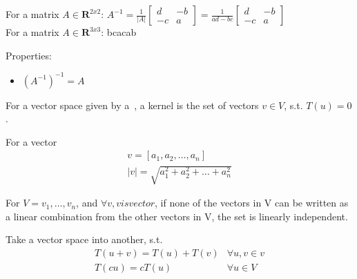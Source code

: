 \begin{definition}[Inverse]
    For a matrix $A \in \mathbf{R}^{2x2}$:
    $A^{-1} = \frac{1}{|A|}
        \begin{bmatrix}
            d & -b \\
            -c & a
        \end{bmatrix}
    = \frac{1}{ad - bc}
        \begin{bmatrix}
            d & -b \\
            -c & a
        \end{bmatrix}
    $\\
    For a matrix $A \in \mathbf{R}^{3x3}$: bcacab

    Properties:
    \begin{itemize}
        \item $(A^{-1})^{-1} = A$
    \end{itemize}
\end{definition}

\begin{definition}[Kernel]
    For a vector space given by a~, a kernel is the set
    of vectors $v \in V$, s.t. $T(u) = 0$.
\end{definition}

\begin{definition}\label{vectorlength}
    For a vector 
    \begin{align*}
        v = [a_{1}, a_{2}, \dots , a_{n}] \\
        |v| = \sqrt{a^{2}_{1} + a^{2}_{2} + \dots + a^{2}_{n}}{}
    \end{align*}
\end{definition}

\begin{definition}
    For $V = {v_{1}, \dots, v_{n}}$, and $\forall v, v is vector$,
    if none of the vectors in V can be written as a linear combination
    from the other vectors in V, the set is linearly independent.
\end{definition}

\begin{definition}\label{lintrans}
    Take a vector space into another, s.t.\
    \begin{align}
        T(u + v) = T(u) + T(v) &\forall u,v \in v \\
        T(cu) = cT(u) &\forall u \in V
    \end{align}
\end{definition}

